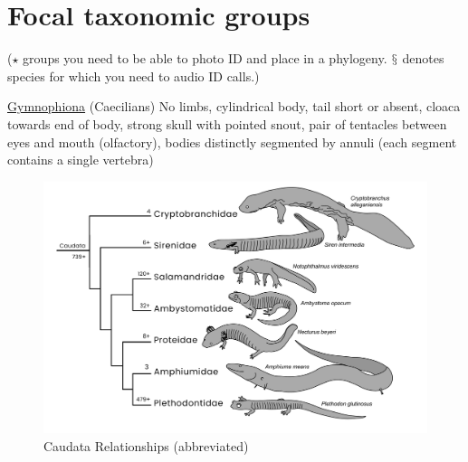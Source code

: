 \documentclass[a4paper,12pt]{article}
\begin{document}
\section*{Focal taxonomic groups} ($\star$ groups you need to be able to photo ID and place in a phylogeny. $\mathsection$ denotes species for which you need to audio ID calls.)
\begin{description}
\item{\underline{{\LARGE{Gymnophiona}}}}
(Caecilians) No limbs, cylindrical body, tail short or absent, cloaca towards end of body, strong skull with pointed snout, pair of tentacles between eyes and mouth (olfactory), bodies distinctly segmented by annuli (each segment contains a single vertebra)

\begin{figure}[H]
\centering
  \includegraphics[scale=0.4]{Caudata_tre.pdf}
  \caption{Caudata Relationships (abbreviated)}
  \label{fig:Caudata}
\end{figure}


\end{description}
\end{document}
